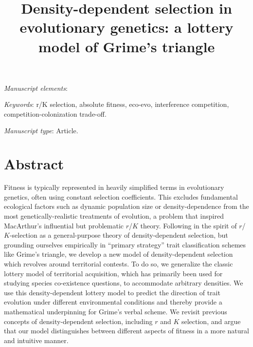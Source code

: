 \documentclass[11pt]{article}
\title{Density-dependent selection in evolutionary genetics: a lottery model of Grime's triangle}
\date{}
\begin{document}
\maketitle




\bigskip

\textit{Manuscript elements}: 

\bigskip

\textit{Keywords}: r/K selection, absolute fitness, eco-evo, interference competition, competition-colonization trade-off.

\bigskip

\textit{Manuscript type}: Article. 

\bigskip


\linenumbers{}
\modulolinenumbers[3]

\newpage{}

\section*{Abstract}

Fitness is typically represented in heavily simplified terms in evolutionary genetics, often using constant selection coefficients. This excludes fundamental ecological factors such as dynamic population size or density-dependence from the most genetically-realistic treatments of evolution, a problem that inspired MacArthur's influential but problematic $r$/$K$ theory. Following in the spirit of $r$/$K$-selection as a general-purpose theory of density-dependent selection, but grounding ourselves empirically in ``primary strategy'' trait classification schemes like Grime's triangle, we develop a new model of density-dependent selection which revolves around territorial contests. To do so, we generalize the classic lottery model of territorial acquisition, which has primarily been used for studying species co-existence questions, to accommodate arbitrary densities. We use this density-dependent lottery model to predict the direction of trait evolution under different environmental conditions and thereby provide a mathematical underpinning for Grime's verbal scheme. We revisit previous concepts of density-dependent selection, including $r$ and $K$ selection, and argue that our model distinguishes between different aspects of fitness in a more natural and intuitive manner.
\end{document}
